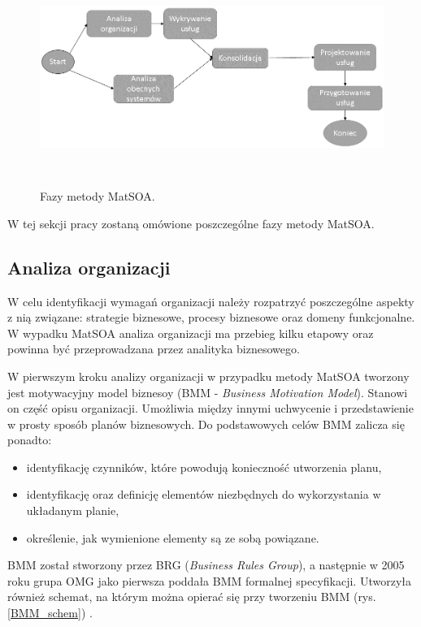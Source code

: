 \begin{figure}[h!tbp]
\begin{centering}
\includegraphics[width=14cm, height=7cm]{img/MetMatSOA.png}
\caption[Fazy metody MatSOA.]{Fazy metody MatSOA.}\label{soam_lifecycle}
\end{centering}
\end{figure}


W tej sekcji pracy zostaną omówione poszczególne fazy metody MatSOA.

\subsection*{Analiza organizacji}
W celu identyfikacji wymagań organizacji należy rozpatrzyć poszczególne aspekty z nią związane: strategie biznesowe, procesy biznesowe oraz domeny funkcjonalne. W wypadku MatSOA analiza organizacji ma przebieg kilku etapowy oraz powinna być przeprowadzana przez analityka biznesowego.

W pierwszym kroku analizy organizacji w przypadku metody MatSOA tworzony jest motywacyjny model biznesoy (BMM - \emph{Business Motivation Model}). Stanowi on część opisu organizacji. Umożliwia między innymi uchwycenie i przedstawienie w prosty sposób planów biznesowych. Do podstawowych celów BMM zalicza się ponadto:
\begin{itemize}
\item{identyfikację czynników, które powodują konieczność utworzenia planu,}
\item{identyfikację oraz definicję elementów niezbędnych do wykorzystania w układanym planie,}
\item{określenie, jak wymienione elementy są ze sobą powiązane.}
\end{itemize}

BMM został stworzony przez BRG (\emph{Business Rules Group}), a następnie w 2005 roku grupa OMG jako pierwsza poddała BMM formalnej specyfikacji. Utworzyła również schemat, na którym można opierać się przy tworzeniu BMM (rys. \ref{BMM_schem}) \cite{AnaWesHal}.


